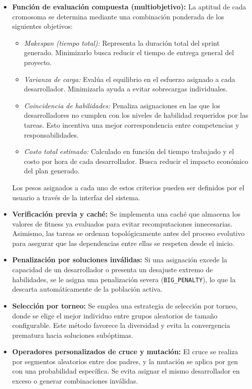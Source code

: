 \begin{itemize}
    \item \textbf{Función de evaluación compuesta (multiobjetivo):} La aptitud de cada cromosoma se determina mediante una combinación ponderada de los siguientes objetivos:
    \begin{itemize}
        \item \textit{Makespan (tiempo total):} Representa la duración total del sprint generado. Minimizarlo busca reducir el tiempo de entrega general del proyecto.
        \item \textit{Varianza de carga:} Evalúa el equilibrio en el esfuerzo asignado a cada desarrollador. Minimizarla ayuda a evitar sobrecargas individuales.
        \item \textit{Coincidencia de habilidades:} Penaliza asignaciones en las que los desarrolladores no cumplen con los niveles de habilidad requeridos por las tareas. Esto incentiva una mejor correspondencia entre competencias y responsabilidades.
        \item \textit{Costo total estimado:} Calculado en función del tiempo trabajado y el costo por hora de cada desarrollador. Busca reducir el impacto económico del plan generado.
    \end{itemize}
    Los pesos asignados a cada uno de estos criterios pueden ser definidos por el usuario a través de la interfaz del sistema.

    \item \textbf{Verificación previa y caché:} Se implementa una caché que almacena los valores de fitness ya evaluados para evitar recomputaciones innecesarias. Asimismo, las tareas se ordenan topológicamente antes del proceso evolutivo para asegurar que las dependencias entre ellas se respeten desde el inicio.

    \item \textbf{Penalización por soluciones inválidas:} Si una asignación excede la capacidad de un desarrollador o presenta un desajuste extremo de habilidades, se le asigna una penalización severa (\texttt{BIG\_PENALTY}), lo que la descarta automáticamente de la población activa.

    \item \textbf{Selección por torneo:} Se emplea una estrategia de selección por torneo, donde se elige el mejor individuo entre grupos aleatorios de tamaño configurable. Este método favorece la diversidad y evita la convergencia prematura hacia soluciones subóptimas.

    \item \textbf{Operadores personalizados de cruce y mutación:} El cruce se realiza por segmentos aleatorios entre dos padres, y la mutación se aplica por gen con una probabilidad específica. Se evita asignar el mismo desarrollador en exceso o generar combinaciones inválidas.


\end{itemize}
